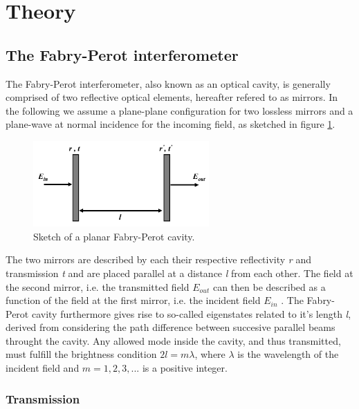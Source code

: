 \section{Theory}
\subsection{The Fabry-Perot interferometer}\label{sec:fabry_perot}

The Fabry-Perot interferometer, also known as an optical cavity, is generally comprised of two reflective optical elements, hereafter refered to as mirrors. In the following we assume a plane-plane configuration for two lossless mirrors and a plane-wave at normal incidence for the incoming field, as sketched in figure \ref{fig:planar_fabry-perot}. 

\begin{figure}[h!]
    \centering
    \includegraphics[width=0.6\textwidth]{figures/planar_fabry_perot.pdf}
    \caption{Sketch of a planar Fabry-Perot cavity.}
    \label{fig:planar_fabry-perot}
\end{figure}

The two mirrors are described by each their respective reflectivity \emph{r} and transmission \emph{t} and are placed parallel at a distance \emph{l} from each other. The field at the second mirror, i.e. the transmitted field $E_{out}$ can then be described as a function of the field at the first mirror, i.e. the incident field $E_{in}$\cite{Eichhorn} \cite{Pedrotti}. The Fabry-Perot cavity furthermore gives rise to so-called eigenstates related to it's length \emph{l}, derived from considering the path difference between succesive parallel beams throught the cavity. Any allowed mode inside the cavity, and thus transmitted, must fulfill the brightness condition $2l = m \lambda$, where $\lambda$ is the wavelength of the incident field and $m=1,2,3,...$ is a positive integer.  

\subsubsection{Transmission}

